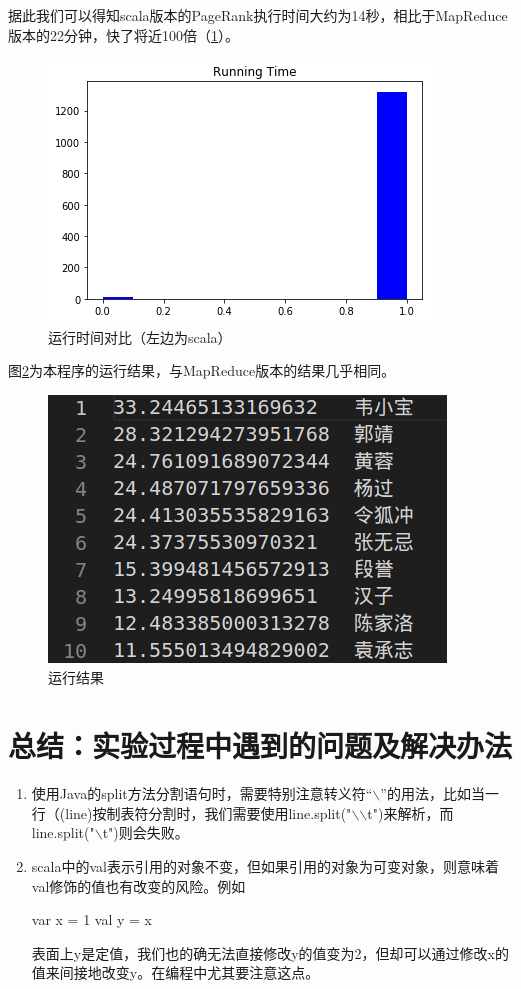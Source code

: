\documentclass[a4paper,UTF8]{article}
\numberwithin{equation}{section}
\begin{document}
\begin{enumerate}[ {(}1{)}]
		据此我们可以得知scala版本的PageRank执行时间大约为14秒，相比于MapReduce版本的22分钟，快了将近100倍（\ref{fig:stask4runtime}）。
		\begin{figure}
			\centering
			\includegraphics[width=0.7\linewidth]{graph/STask4RunTime}
			\caption[9]{运行时间对比（左边为scala）}
			\label{fig:stask4runtime}
		\end{figure}		
		
		图\ref{fig:stask4result}为本程序的运行结果，与MapReduce版本的结果几乎相同。
		\begin{figure}
			\centering
			\includegraphics[width=0.7\linewidth]{graph/STask4Result}
			\caption[10]{运行结果}
			\label{fig:stask4result}
		\end{figure}
		
	\end{enumerate}

	\section{总结：实验过程中遇到的问题及解决办法}
	\begin{enumerate}[ {(}1{)}]
		\item 使用Java的split方法分割语句时，需要特别注意转义符“$\backslash$”的用法，比如当一行（(line)按制表符分割时，我们需要使用line.split("$\backslash$$\backslash$t")来解析，而line.split("$\backslash$t")则会失败。
		\item 
		scala中的val表示引用的对象不变，但如果引用的对象为可变对象，则意味着val修饰的值也有改变的风险。例如
		\begin{center}
			var x = 1
			val y = x
		\end{center}
		表面上y是定值，我们也的确无法直接修改y的值变为2，但却可以通过修改x的值来间接地改变y。在编程中尤其要注意这点。
	\end{enumerate}
\end{document}
